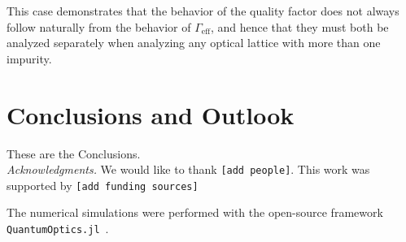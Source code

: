 \documentclass[aps,pra,superscriptaddress,twocolumn]{revtex4-1}
\newcommand{\commentSO}[1]{\texttt{\color{orange}[#1]}}
\begin{document}
This case demonstrates that the behavior of the quality factor does not always follow naturally from the behavior of $\Gamma_\text{eff}$, and hence that they must both be analyzed separately when analyzing any optical lattice with more than one impurity. 

\section{Conclusions and Outlook}\label{sec:conclusion}

These are the Conclusions.\\[2ex]

\emph{Acknowledgments.} We would like to thank \commentSO{add people}. This work was supported by \commentSO{add funding sources}

The numerical simulations were performed with the open-source framework \texttt{QuantumOptics.jl}~\cite{kramer_quantumopticsjl_2018}.




\end{document}
